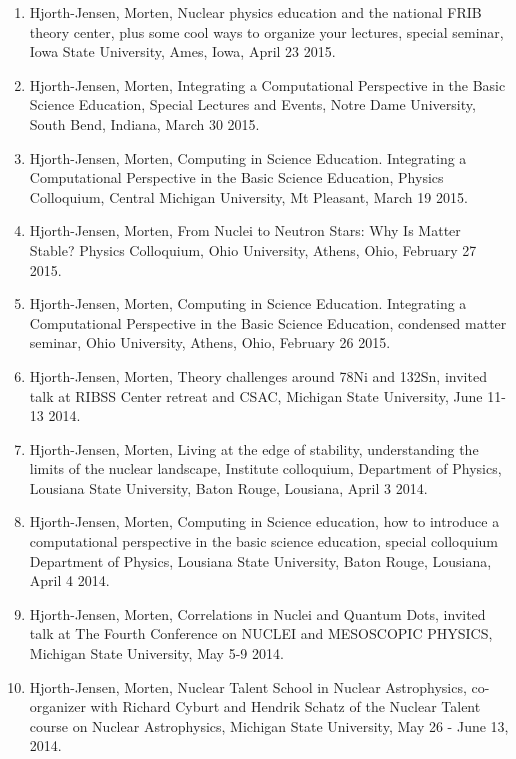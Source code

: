 \documentclass[%
oneside,                 %
final,                   %
10pt]{article}
\begin{document}
\begin{enumerate}
\item Hjorth-Jensen, Morten, Nuclear physics education and the national FRIB theory center, plus some cool ways to organize your lectures, special seminar, Iowa State University, Ames, Iowa, April 23 2015.

\item Hjorth-Jensen, Morten, Integrating a Computational Perspective in the Basic Science Education, Special Lectures and Events, Notre Dame University, South Bend, Indiana, March 30 2015.

\item Hjorth-Jensen, Morten, Computing in Science Education.  Integrating a Computational Perspective in the Basic Science Education, Physics Colloquium, Central Michigan University, Mt Pleasant, March 19 2015.

\item Hjorth-Jensen, Morten, From Nuclei to Neutron Stars: Why Is Matter Stable? Physics Colloquium, Ohio University, Athens, Ohio,  February 27 2015.

\item Hjorth-Jensen, Morten, Computing in Science Education.  Integrating a Computational Perspective in the Basic Science Education, condensed matter seminar, Ohio University, Athens, Ohio,  February 26 2015.

\item Hjorth-Jensen, Morten, Theory challenges around 78Ni and 132Sn, invited talk at  RIBSS Center retreat and CSAC, Michigan State University, June 11-13 2014.

\item Hjorth-Jensen, Morten, Living at the edge of stability, understanding the limits of the nuclear landscape, Institute colloquium, Department of Physics, Lousiana State University, Baton Rouge, Lousiana, April 3 2014.

\item Hjorth-Jensen, Morten, Computing in Science education, how to introduce a computational perspective in the basic science education, special colloquium Department of Physics, Lousiana State University, Baton Rouge, Lousiana, April 4 2014.

\item Hjorth-Jensen, Morten, Correlations in Nuclei and Quantum Dots, invited talk at  The Fourth Conference on NUCLEI and MESOSCOPIC PHYSICS, Michigan State University, May 5-9 2014.

\item Hjorth-Jensen, Morten, Nuclear Talent School in Nuclear Astrophysics, co-organizer with Richard Cyburt and Hendrik Schatz of the Nuclear Talent course on Nuclear Astrophysics,  Michigan State University, May 26 - June 13, 2014. 


\end{enumerate}
\end{document}
